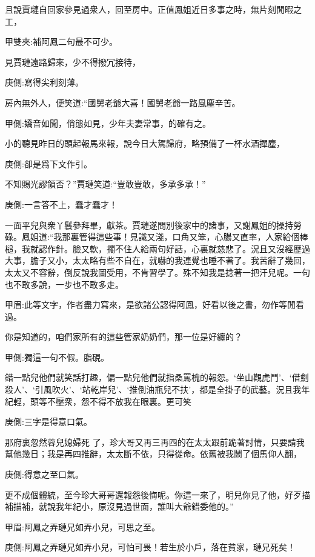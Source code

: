 \begin{parag}
    且說賈璉自回家參見過衆人，回至房中。正值鳳姐近日多事之時，無片刻閒暇之工，\begin{note}甲雙夾:補阿鳳二句最不可少。\end{note}見賈璉遠路歸來，少不得撥冗接待，\begin{note}庚側:寫得尖利刻薄。\end{note}房內無外人，便笑道:“國舅老爺大喜！國舅老爺一路風塵辛苦。\begin{note}甲側:嬌音如聞，俏態如見，少年夫妻常事，的確有之。\end{note}小的聽見昨日的頭起報馬來報，說今日大駕歸府，略預備了一杯水酒撣塵，\begin{note}庚側:卻是爲下文作引。\end{note}不知賜光謬領否？”賈璉笑道:“豈敢豈敢，多承多承！”\begin{note}庚側:一言答不上，蠢才蠢才！\end{note}一面平兒與衆丫鬟參拜畢，獻茶。賈璉遂問別後家中的諸事，又謝鳳姐的操持勞碌。鳳姐道:“我那裏管得這些事！見識又淺，口角又笨，心腸又直率，人家給個棒槌，我就認作針。臉又軟，擱不住人給兩句好話，心裏就慈悲了。況且又沒經歷過大事，膽子又小，太太略有些不自在，就嚇的我連覺也睡不著了。我苦辭了幾回，太太又不容辭，倒反說我圖受用，不肯習學了。殊不知我是捻著一把汗兒呢。一句也不敢多說，一步也不敢多走。\begin{note}甲眉:此等文字，作者盡力寫來，是欲諸公認得阿鳳，好看以後之書，勿作等閒看過。\end{note}你是知道的，咱們家所有的這些管家奶奶們，那一位是好纏的？\begin{note}甲側:獨這一句不假。脂硯。\end{note}錯一點兒他們就笑話打趣，偏一點兒他們就指桑罵槐的報怨。‘坐山觀虎鬥’、‘借劍殺人’、‘引風吹火’、‘站乾岸兒’、‘推倒油瓶兒不扶’，都是全掛子的武藝。況且我年紀輕，頭等不壓衆，怨不得不放我在眼裏。更可笑\begin{note}庚側:三字是得意口氣。\end{note}那府裏忽然蓉兒媳婦死 了，珍大哥又再三再四的在太太跟前跪著討情，只要請我幫他幾日；我是再四推辭，太太斷不依，只得從命。依舊被我鬧了個馬仰人翻，\begin{note}庚側:得意之至口氣。\end{note}更不成個體統，至今珍大哥哥還報怨後悔呢。你這一來了，明兒你見了他，好歹描補描補，就說我年紀小，原沒見過世面，誰叫大爺錯委他的。”\begin{note}甲眉:阿鳳之弄璉兄如弄小兒，可思之至。\end{note}\begin{note}庚側:阿鳳之弄璉兄如弄小兒，可怕可畏！若生於小戶，落在貧家，璉兄死矣！\end{note}
\end{parag}


